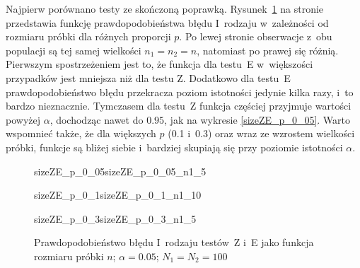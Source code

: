 %
%
%

Najpierw porównano testy ze skończoną poprawką. Rysunek~\ref{sizeZE_n} na stronie~\pageref{sizeZE_n} przedstawia funkcję prawdopodobieństwa błędu I~rodzaju w~zależności od rozmiaru próbki dla różnych proporcji $p$. Po lewej stronie obserwacje z~obu populacji są tej samej wielkości $n_1=n_2=n$, natomiast po prawej się różnią. Pierwszym spostrzeżeniem jest to, że funkcja dla testu~E w~większości przypadków jest mniejsza niż dla testu Z. Dodatkowo dla testu~E prawdopodobieństwo błędu przekracza poziom istotności jedynie kilka razy, i~to bardzo nieznacznie. Tymczasem dla testu~Z funkcja częściej przyjmuje wartości powyżej $\alpha$, dochodząc nawet do $0.95$, jak na wykresie \ref{sizeZE_p_0_05}. Warto wspomnieć także, że dla większych $p$ (0.1 i~0.3) oraz wraz ze wzrostem wielkości próbki, funkcje są bliżej siebie i~bardziej skupiają się przy poziomie istotności $\alpha$.

\begin{figure}[p]
	\begin{subdiagrams}{sizeZE_p_0_05}{sizeZE_p_0_05_n1_5}
	\end{subdiagrams}
	
	\begin{subdiagrams}{sizeZE_p_0_1}{sizeZE_p_0_1_n1_10}
	\end{subdiagrams}
	
	\begin{subdiagrams}{sizeZE_p_0_3}{sizeZE_p_0_3_n1_5}
	\end{subdiagrams}
	\caption{Prawdopodobieństwo błędu I~rodzaju testów~Z i~E jako funkcja rozmiaru próbki $n$; $\alpha=0.05$; $N_1=N_2=100$}
	\label{sizeZE_n}
\end{figure}

